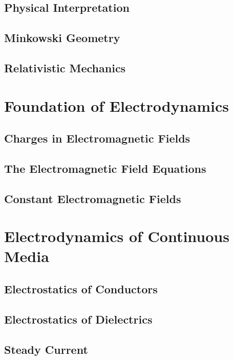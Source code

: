 \documentclass[
    ebook,
    11pt,
    twoside,
    onecolumn,
    openright,
    final
]{memoir}
\begin{document}
\chapter{Physical Interpretation}

\chapter{Minkowski Geometry}

\chapter{Relativistic Mechanics}

\part{Foundation of Electrodynamics}

\chapter{Charges in Electromagnetic Fields}

\chapter{The Electromagnetic Field Equations}

\chapter{Constant Electromagnetic Fields}

\part{Electrodynamics of Continuous Media}

\chapter{Electrostatics of Conductors}

\chapter{Electrostatics of Dielectrics}

\chapter{Steady Current}
\end{document}
